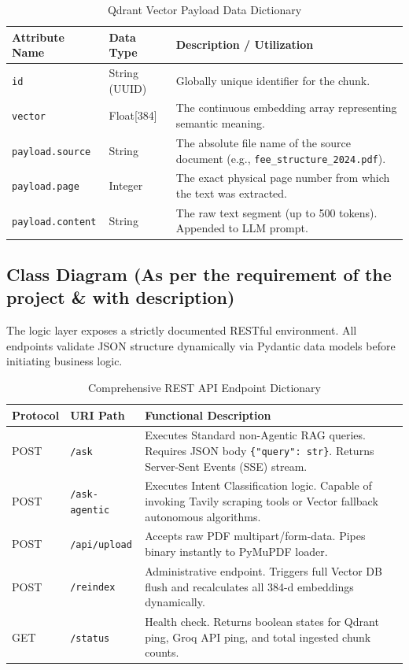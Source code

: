 \documentclass[12pt,a4paper]{report}
\begin{document}
\begin{table}[h!]
\centering
\caption{Qdrant Vector Payload Data Dictionary}
\begin{tabularx}{\textwidth}{|l|l|X|}
\hline
\textbf{Attribute Name} & \textbf{Data Type} & \textbf{Description / Utilization} \\ \hline
\texttt{id} & String (UUID) & Globally unique identifier for the chunk. \\ \hline
\texttt{vector} & Float[384] & The continuous embedding array representing semantic meaning. \\ \hline
\texttt{payload.source} & String & The absolute file name of the source document (e.g., \texttt{fee\_structure\_2024.pdf}). \\ \hline
\texttt{payload.page} & Integer & The exact physical page number from which the text was extracted. \\ \hline
\texttt{payload.content} & String & The raw text segment (up to 500 tokens). Appended to LLM prompt. \\ \hline
\end{tabularx}
\end{table}

\subsection{Class Diagram (As per the requirement of the project \& with description)}
The logic layer exposes a strictly documented RESTful environment. All endpoints validate JSON structure dynamically via Pydantic data models before initiating business logic.

\begin{table}[h]
\centering
\caption{Comprehensive REST API Endpoint Dictionary}
\label{tab:endpoints}
\begin{tabularx}{\textwidth}{|l|l|X|}
\hline
\textbf{Protocol} & \textbf{URI Path} & \textbf{Functional Description} \\ \hline
POST & \texttt{/ask} & Executes Standard non-Agentic RAG queries. Requires JSON body \texttt{\{"query": str\}}. Returns Server-Sent Events (SSE) stream. \\ \hline
POST & \texttt{/ask-agentic} & Executes Intent Classification logic. Capable of invoking Tavily scraping tools or Vector fallback autonomous algorithms. \\ \hline
POST & \texttt{/api/upload} & Accepts raw PDF multipart/form-data. Pipes binary instantly to PyMuPDF loader. \\ \hline
POST & \texttt{/reindex} & Administrative endpoint. Triggers full Vector DB flush and recalculates all 384-d embeddings dynamically. \\ \hline
GET & \texttt{/status} & Health check. Returns boolean states for Qdrant ping, Groq API ping, and total ingested chunk counts. \\ \hline
\end{tabularx}
\end{table}
\end{document}
